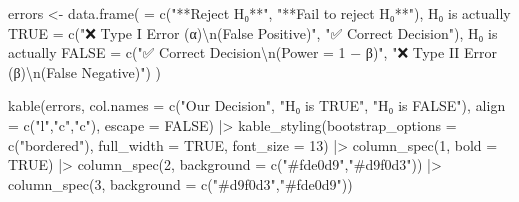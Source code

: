\documentclass[
  12pt,
  letterpaper,
]{book}
\newenvironment{Shaded}{\begin{snugshade}}{\end{snugshade}}
\newcommand{\AttributeTok}[1]{\textcolor[rgb]{0.40,0.45,0.13}{#1}}
\newcommand{\ConstantTok}[1]{\textcolor[rgb]{0.56,0.35,0.01}{#1}}
\newcommand{\DecValTok}[1]{\textcolor[rgb]{0.68,0.00,0.00}{#1}}
\newcommand{\FunctionTok}[1]{\textcolor[rgb]{0.28,0.35,0.67}{#1}}
\newcommand{\NormalTok}[1]{\textcolor[rgb]{0.00,0.23,0.31}{#1}}
\newcommand{\OtherTok}[1]{\textcolor[rgb]{0.00,0.23,0.31}{#1}}
\newcommand{\SpecialCharTok}[1]{\textcolor[rgb]{0.37,0.37,0.37}{#1}}
\newcommand{\StringTok}[1]{\textcolor[rgb]{0.13,0.47,0.30}{#1}}
\begin{document}
\begin{Shaded}
\begin{Highlighting}[]
\NormalTok{errors }\OtherTok{\textless{}{-}} \FunctionTok{data.frame}\NormalTok{(}
  \StringTok{\textasciigrave{}}\AttributeTok{ }\StringTok{\textasciigrave{}} \OtherTok{=} \FunctionTok{c}\NormalTok{(}\StringTok{"**Reject H₀**"}\NormalTok{, }\StringTok{"**Fail to reject H₀**"}\NormalTok{),}
  \StringTok{\textasciigrave{}}\AttributeTok{H₀ is actually TRUE}\StringTok{\textasciigrave{}} \OtherTok{=} \FunctionTok{c}\NormalTok{(}\StringTok{"❌ Type I Error (α)}\SpecialCharTok{\textbackslash{}n}\StringTok{(False Positive)"}\NormalTok{,}
                              \StringTok{"✅ Correct Decision"}\NormalTok{),}
  \StringTok{\textasciigrave{}}\AttributeTok{H₀ is actually FALSE}\StringTok{\textasciigrave{}} \OtherTok{=} \FunctionTok{c}\NormalTok{(}\StringTok{"✅ Correct Decision}\SpecialCharTok{\textbackslash{}n}\StringTok{(Power = 1 − β)"}\NormalTok{,}
                               \StringTok{"❌ Type II Error (β)}\SpecialCharTok{\textbackslash{}n}\StringTok{(False Negative)"}\NormalTok{)}
\NormalTok{)}

\FunctionTok{kable}\NormalTok{(errors, }\AttributeTok{col.names =} \FunctionTok{c}\NormalTok{(}\StringTok{"Our Decision"}\NormalTok{, }\StringTok{"H₀ is TRUE"}\NormalTok{, }\StringTok{"H₀ is FALSE"}\NormalTok{),}
      \AttributeTok{align =} \FunctionTok{c}\NormalTok{(}\StringTok{"l"}\NormalTok{,}\StringTok{"c"}\NormalTok{,}\StringTok{"c"}\NormalTok{), }\AttributeTok{escape =} \ConstantTok{FALSE}\NormalTok{) }\SpecialCharTok{|\textgreater{}}
  \FunctionTok{kable\_styling}\NormalTok{(}\AttributeTok{bootstrap\_options =} \FunctionTok{c}\NormalTok{(}\StringTok{"bordered"}\NormalTok{),}
                \AttributeTok{full\_width =} \ConstantTok{TRUE}\NormalTok{, }\AttributeTok{font\_size =} \DecValTok{13}\NormalTok{) }\SpecialCharTok{|\textgreater{}}
  \FunctionTok{column\_spec}\NormalTok{(}\DecValTok{1}\NormalTok{, }\AttributeTok{bold =} \ConstantTok{TRUE}\NormalTok{) }\SpecialCharTok{|\textgreater{}}
  \FunctionTok{column\_spec}\NormalTok{(}\DecValTok{2}\NormalTok{, }\AttributeTok{background =} \FunctionTok{c}\NormalTok{(}\StringTok{"\#fde0d9"}\NormalTok{,}\StringTok{"\#d9f0d3"}\NormalTok{)) }\SpecialCharTok{|\textgreater{}}
  \FunctionTok{column\_spec}\NormalTok{(}\DecValTok{3}\NormalTok{, }\AttributeTok{background =} \FunctionTok{c}\NormalTok{(}\StringTok{"\#d9f0d3"}\NormalTok{,}\StringTok{"\#fde0d9"}\NormalTok{))}
\end{Highlighting}
\end{Shaded}
\end{document}
